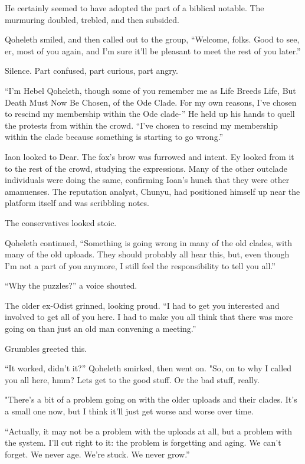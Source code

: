 He certainly seemed to have adopted the part of a biblical notable. The murmuring doubled, trebled, and then subsided.

Qoheleth smiled, and then called out to the group, ``Welcome, folks. Good to see, er, most of you again, and I'm sure it'll be pleasant to meet the rest of you later.''

Silence. Part confused, part curious, part angry.

``I'm Hebel Qoheleth, though some of you remember me as Life Breeds Life, But Death Must Now Be Chosen, of the Ode Clade. For my own reasons, I've chosen to rescind my membership within the Ode clade-'' He held up his hands to quell the protests from within the crowd. ``I've chosen to rescind my membership within the clade because something is starting to go wrong.''

Iaon looked to Dear. The fox's brow was furrowed and intent. Ey looked from it to the rest of the crowd, studying the expressions. Many of the other outclade individuals were doing the same, confirming Ioan's hunch that they were other amanuenses. The reputation analyst, Chunyu, had positioned himself up near the platform itself and was scribbling notes.

The conservatives looked stoic.

Qoheleth continued, ``Something is going wrong in many of the old clades, with many of the old uploads. They should probably all hear this, but, even though I'm not a part of you anymore, I still feel the responsibility to tell you all.''

``Why the puzzles?'' a voice shouted.

The older ex-Odist grinned, looking proud. ``I had to get you interested and involved to get all of you here. I had to make you all think that there was more going on than just an old man convening a meeting.''

Grumbles greeted this.

``It worked, didn't it?'' Qoheleth smirked, then went on. "So, on to why I called you all here, hmm? Lets get to the good stuff. Or the bad stuff, really.

"There's a bit of a problem going on with the older uploads and their clades. It's a small one now, but I think it'll just get worse and worse over time.

``Actually, it may not be a problem with the uploads at all, but a problem with the system. I'll cut right to it: the problem is forgetting and aging. We can't forget. We never age. We're stuck. We never grow.''

